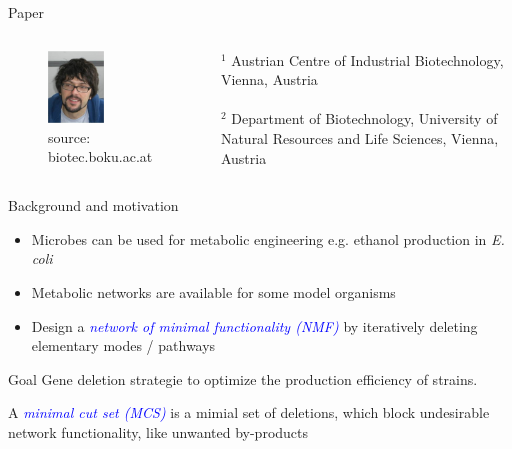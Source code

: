 \documentclass{beamer}
\begin{document}
\begin{frame}{Paper}
\begin{columns}
      \begin{center}
        \begin{figure}
         \includegraphics[width=0.5\textwidth]{grafik/zanghellini} \\
         \tiny{source: biotec.boku.ac.at}
        \end{figure}
      \end{center}
    \tiny {$^{1}$ Austrian Centre of Industrial 
        Biotechnology, Vienna, Austria} 
    \\ ~ \\
    \tiny {$^{2}$ Department of Biotechnology, 
        University of Natural Resources and Life Sciences, 
        Vienna, Austria} 
 \end{columns}
\end{frame}

\begin{frame}{Background and motivation}
    \begin{itemize}
        \item Microbes can be used for metabolic engineering 
        e.g. ethanol production in \emph{E. coli}
        \item Metabolic networks are available for some model organisms
    	\item Design a \emph{\textcolor{blue}{network of minimal functionality (NMF)}}
         by iteratively deleting elementary modes / pathways 
	\end{itemize}
    
    \begin{block}{Goal}
        Gene deletion strategie to optimize the production 
        efficiency of strains.
    \end{block}

    \begin{definition}
        A \emph{\textcolor{blue}{minimal cut set (MCS)}} is a mimial set of deletions, 
        which block undesirable network functionality, like unwanted by-products
    \end{definition}

\end{frame}
\end{document}
